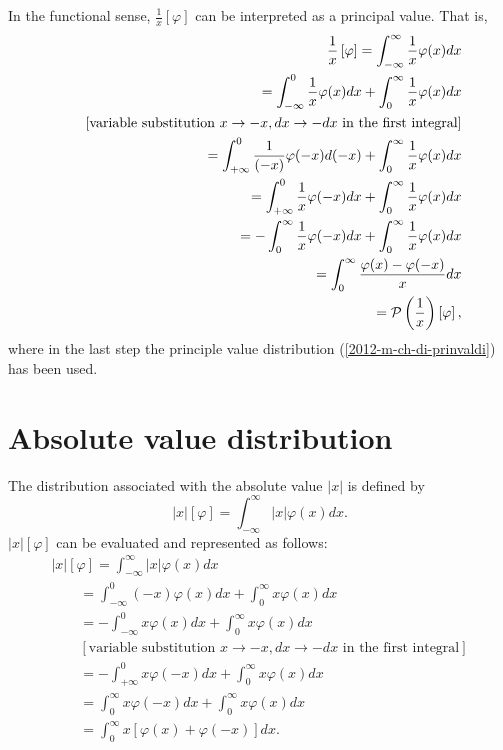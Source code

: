 In the functional sense,
$\frac{1}{x}\left[ \varphi \right]$ can be interpreted as a principal value.
That is,
\begin{equation}
\begin{split}
\frac{1}{x} \left[ \varphi \right]
=
\int_{-\infty}^\infty  \frac{1}{x}  \varphi(x) dx
\\
\qquad
=
\int_{-\infty}^0 \frac{1}{x}   \varphi(x) dx
+
\int_{0}^\infty   \frac{1}{x}   \varphi(x) dx
\\
\qquad
[\textrm{variable substitution }x\rightarrow -x, dx \rightarrow -dx \textrm{ in the first integral}]
\\
\qquad
=
\int_{+\infty}^0  \frac{1}{(-x)}    \varphi(-x) d(-x)
+
\int_{0}^\infty    \frac{1}{x}   \varphi(x) dx
\\
\qquad
=
\int_{+\infty}^0  \frac{1}{x}    \varphi(-x) d x
+
\int_{0}^\infty   \frac{1}{x}    \varphi(x) dx
\\
\qquad
=
-\int_0^{\infty}  \frac{1}{x}   \varphi(-x) d x
+
\int_{0}^\infty   \frac{1}{x}    \varphi(x) dx
\\
\qquad
=
\int_{0}^\infty   \frac{ \varphi(x) - \varphi(-x) }{x} dx
\\
\qquad =
{\cal P} \left(\frac{1}{x}\right) \left[\varphi\right]
,
\end{split}
\end{equation}
where in the last step the principle value distribution (\ref{2012-m-ch-di-prinvaldi})
has been used.




\section{Absolute value distribution}


The distribution associated with the absolute value $\left|x\right|$ is defined by
 \begin{equation}
\left|x\right| \left[ \varphi \right] =
\int_{-\infty}^\infty  \left|x\right|  \varphi(x) dx.
 \end{equation}
$\left|x\right| \left[ \varphi \right]$
can be evaluated and represented as follows:
\begin{equation}
\begin{split}
\left|x\right| \left[ \varphi \right]
=
\int_{-\infty}^\infty  \left|x\right|  \varphi(x) dx
\\
\qquad
=
\int_{-\infty}^0 (-x)  \varphi(x) dx
+
\int_{0}^\infty   x   \varphi(x) dx
\\
\qquad
=
-\int_{-\infty}^0  x   \varphi(x) dx
+
\int_{0}^\infty   x   \varphi(x) dx
\\
\qquad
[\textrm{variable substitution }x\rightarrow -x, dx \rightarrow -dx \textrm{ in the first integral}]
\\
\qquad
=
-\int_{+\infty}^0  x   \varphi(-x) dx
+
\int_{0}^\infty   x   \varphi(x) dx
\\
\qquad
=
\int_0^{\infty}  x   \varphi(-x) dx
+
\int_{0}^\infty   x   \varphi(x) dx
\\
\qquad
=
\int_0^{\infty}  x   \left[ \varphi(x) + \varphi(-x) \right] dx .
\end{split}
\end{equation}


